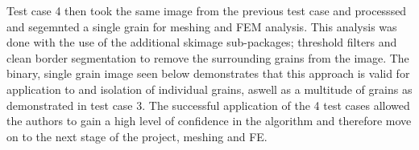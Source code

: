 \documentclass[\report.tex]{subfiles}
\begin{document}
\noindent Test case 4 then took the same image from the previous test case and processsed and segemnted a single grain for meshing and FEM analysis. This analysis was done with the use of the additional skimage sub-packages; threshold filters and clean border segmentation to remove the surrounding grains from the image. The binary, single grain image seen below demonstrates that this approach is valid for application to and isolation of individual grains, aswell as a multitude of grains as demonstrated in test case 3. The successful application of the 4 test cases allowed the authors to gain a high level of confidence in the algorithm and therefore move on to the next stage of the project, meshing and FE.
\end{document}
